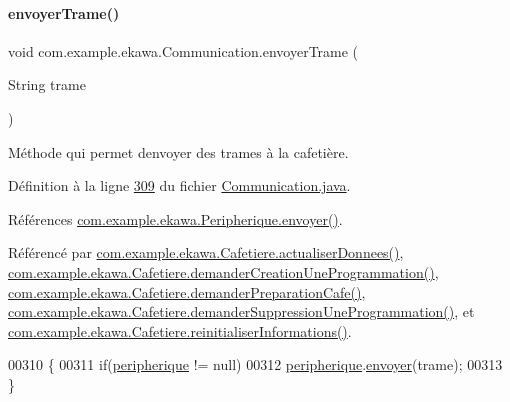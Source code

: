 \paragraph{\texorpdfstring{envoyer\+Trame()}{envoyerTrame()}}
{\footnotesize\ttfamily void com.\+example.\+ekawa.\+Communication.\+envoyer\+Trame (\begin{DoxyParamCaption}\item[{String}]{trame }\end{DoxyParamCaption})}



Méthode qui permet d\textquotesingle{}envoyer des trames à la cafetière. 



Définition à la ligne \hyperlink{_communication_8java_source_l00309}{309} du fichier \hyperlink{_communication_8java_source}{Communication.\+java}.



Références \hyperlink{_peripherique_8java_source_l00197}{com.\+example.\+ekawa.\+Peripherique.\+envoyer()}.



Référencé par \hyperlink{_cafetiere_8java_source_l00495}{com.\+example.\+ekawa.\+Cafetiere.\+actualiser\+Donnees()}, \hyperlink{_cafetiere_8java_source_l00720}{com.\+example.\+ekawa.\+Cafetiere.\+demander\+Creation\+Une\+Programmation()}, \hyperlink{_cafetiere_8java_source_l00397}{com.\+example.\+ekawa.\+Cafetiere.\+demander\+Preparation\+Cafe()}, \hyperlink{_cafetiere_8java_source_l00793}{com.\+example.\+ekawa.\+Cafetiere.\+demander\+Suppression\+Une\+Programmation()}, et \hyperlink{_cafetiere_8java_source_l00683}{com.\+example.\+ekawa.\+Cafetiere.\+reinitialiser\+Informations()}.


\begin{DoxyCode}
00310     \{
00311         \textcolor{keywordflow}{if}(\hyperlink{classcom_1_1example_1_1ekawa_1_1_communication_a59a25b4807148701560e4341f79c0c16}{peripherique} != null)
00312             \hyperlink{classcom_1_1example_1_1ekawa_1_1_communication_a59a25b4807148701560e4341f79c0c16}{peripherique}.\hyperlink{classcom_1_1example_1_1ekawa_1_1_peripherique_ac1361bc1a445b00c4c7ebb56dfee274d}{envoyer}(trame);
00313     \}
\end{DoxyCode}
\mbox{\label{classcom_1_1example_1_1ekawa_1_1_communication_a1007662e44cb2d0af3bef6d36246bf9a}} 
